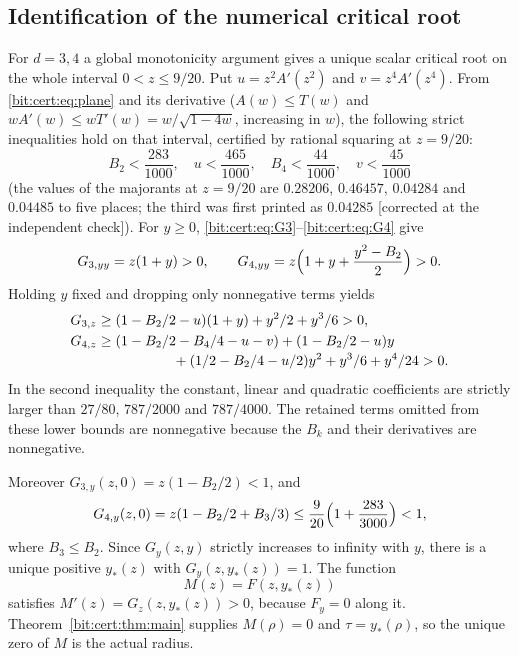 \documentclass[11pt]{article}
\theoremstyle{definition}\newtheorem{definition}[theorem]{Definition}
\theoremstyle{remark}\newtheorem{remark}[theorem]{Remark}
\begin{document}
\subsection{Identification of the numerical critical root}\label{bit:cert:sec:identify}
For $d=3,4$ a global monotonicity argument gives a unique scalar critical root
on the whole interval $0<z\le9/20$. Put $u=z^2A'(z^2)$ and $v=z^4A'(z^4)$. From
\eqref{bit:cert:eq:plane} and its derivative ($A(w)\le T(w)$ and
$wA'(w)\le wT'(w)=w/\sqrt{1-4w}$, increasing in $w$), the following strict
inequalities hold on that interval, certified by rational squaring at
$z=9/20$:
\begin{equation}\label{bit:cert:eq:globalbounds}
 B_2<\frac{283}{1000},\quad u<\frac{465}{1000},\quad
 B_4<\frac{44}{1000},\quad v<\frac{45}{1000}
\end{equation}
(the values of the majorants at $z=9/20$ are $0.28206$, $0.46457$, $0.04284$
and $0.04485$ to five places; the third was first printed as $0.04285$
\textup{[}corrected at the independent check\textup{]}). For $y\ge0$, \eqref{bit:cert:eq:G3}--\eqref{bit:cert:eq:G4}
give
\[
 G_{3,yy}=z(1+y)>0,\qquad
 G_{4,yy}=z\Bigl(1+y+\frac{y^2-B_2}2\Bigr)>0.
\]
Holding $y$ fixed and dropping only nonnegative terms yields
\begin{align}
 G_{3,z}&\ge(1-B_2/2-u)(1+y)+y^2/2+y^3/6>0,\label{bit:cert:eq:G3positive}\\
 G_{4,z}&\ge(1-B_2/2-B_4/4-u-v)
 +(1-B_2/2-u)y\notag\\[-2pt]
 &\hspace{19mm}+(1/2-B_2/4-u/2)y^2+y^3/6+y^4/24>0.\label{bit:cert:eq:G4positive}
\end{align}
In the second inequality the constant, linear and quadratic coefficients are
strictly larger than $27/80$, $787/2000$ and $787/4000$. The retained terms
omitted from these lower bounds are nonnegative because the $B_k$ and their
derivatives are nonnegative.

Moreover $G_{3,y}(z,0)=z(1-B_2/2)<1$, and
\[
 G_{4,y}(z,0)=z(1-B_2/2+B_3/3)
 \le\frac9{20}\Bigl(1+\frac{283}{3000}\Bigr)<1,
\]
where $B_3\le B_2$. Since $G_y(z,y)$ strictly increases to infinity with $y$,
there is a unique positive $y_*(z)$ with $G_y(z,y_*(z))=1$. The function
\begin{equation}\label{bit:cert:eq:M}
 M(z)=F(z,y_*(z))
\end{equation}
satisfies $M'(z)=G_z(z,y_*(z))>0$, because $F_y=0$ along it.
Theorem~\ref{bit:cert:thm:main} supplies $M(\rho)=0$ and $\tau=y_*(\rho)$, so
the unique zero of $M$ is the actual radius.
\end{document}
